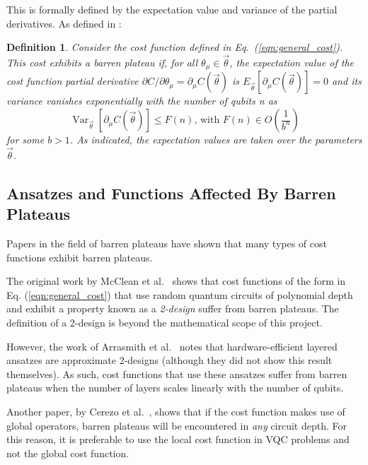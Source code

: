 \documentclass[a4paper,12pt]{article}
\newcommand{\thetas}{\vec{\theta}}
\newcommand{\del}{\partial}
\DeclareMathOperator{\Var}{Var}
\newtheorem{definition}{Definition}
\begin{document}
This is formally defined by the expectation value and variance of the partial derivatives.
As defined in \cite{arrasmith_effect_2021}:

\begin{definition} \label{def:bp}
    Consider the cost function defined in Eq.~(\ref{eqn:general_cost}). This cost exhibits a barren plateau if, for all $\theta_\mu \in \thetas$, the expectation value of the cost function partial derivative
    $\del C / \del\theta_\mu = \del_\mu C(\thetas)$
    is
    $E_{\thetas}[\del_\mu C(\thetas)] = 0$
    and its variance vanishes exponentially with the number of qubits n as 
    \begin{equation} \label{eqn:vanishing}
        \Var_{\thetas}[\del_\mu C(\thetas)] \leq F(n) \textrm{,   with   }F(n) \in O\left(\frac{1}{b^n}\right)
    \end{equation}
    for some $b > 1$. As indicated, the expectation values are taken over the parameters $\thetas$.
\end{definition}

\subsection{Ansatzes and Functions Affected By Barren Plateaus}
Papers in the field of barren plateaus have shown that many types of cost functions exhibit barren plateaus.

The original work by McClean et al.~\cite{mcclean_barren_2018} shows that cost functions of the form in Eq. (\ref{eqn:general_cost}) that use random quantum circuits of polynomial depth and exhibit a property known as a \emph{2-design} suffer from barren plateaus.
The definition of a 2-design is beyond the mathematical scope of this project.

However, the work of Arrasmith et al.~\cite{arrasmith_effect_2021} notes that hardware-efficient layered ansatzes are approximate 2-designs (although they did not show this result themselves).
As such, cost functions that use these ansatzes suffer from barren plateaus when the number of layers scales linearly with the number of qubits.

Another paper, by Cerezo et al.~\cite{cerezo_cost_2021}, shows that if the cost function makes use of global operators, barren plateaus will be encountered in \emph{any} circuit depth.
For this reason, it is preferable to use the local cost function in VQC problems and not the global cost function.
\end{document}
